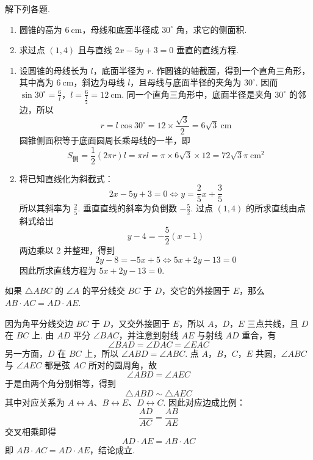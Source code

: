 \begin{problem}
解下列各题.

\begin{enumerate}
    \item 圆锥的高为 \(6 \mathrm{~cm}\)，母线和底面半径成 \(30^\circ\) 角，求它的侧面积.

    \item 求过点 \(\left(1,4\right)\) 且与直线 \(2x-5y+3=0\) 垂直的直线方程.
\end{enumerate}
\end{problem}

\begin{solution}
\begin{enumerate}
    \item 设圆锥的母线长为 \(l\)，底面半径为 \(r\). 作圆锥的轴截面，得到一个直角三角形，其中高为 \(6\mathrm{~cm}\)，斜边为母线 \(l\)，且母线与底面半径的夹角为 \(30^\circ\). 因而
\(\sin30^\circ=\frac{6}{l}\)，\(l=\frac6{\frac{1}{2}}=12\mathrm{~cm}\).
    同一个直角三角形中，底面半径是夹角 \(30^\circ\) 的邻边，所以
    \[
    r=l\cos30^\circ=12\times\frac{\sqrt3}{2}=6\sqrt3\mathrm{~cm}
    \]
    圆锥侧面积等于底面圆周长乘母线的一半，即
    \[
    S_{\text{侧}}=\frac12(2\pi r)l=\pi rl
    =\pi\times6\sqrt3\times12=72\sqrt3\pi\mathrm{~cm}^2
    \]
    \item 将已知直线化为斜截式：
    \[
    2x-5y+3=0\Longleftrightarrow y=\frac25x+\frac35
    \]
    所以其斜率为 \(\frac25\). 垂直直线的斜率为负倒数 \(-\frac52\). 过点 \(\left(1,4\right)\) 的所求直线由点斜式给出
    \[
    y-4=-\frac52(x-1)
    \]
    两边乘以 \(2\) 并整理，得到
    \[
    2y-8=-5x+5\Longleftrightarrow 5x+2y-13=0
    \]
    因此所求直线方程为 \(5x+2y-13=0\).
\end{enumerate}
\end{solution}

\begin{problem}
如果 \( \triangle ABC \) 的 \( \angle A \) 的平分线交 \(BC\) 于 \(D\)，交它的外接圆于 \(E\)，那么 \( AB\cdot AC=AD\cdot AE \).

\end{problem}

\begin{solution}
因为角平分线交边 \(BC\) 于 \(D\)，又交外接圆于 \(E\)，所以 \(A\)，\(D\)，\(E\) 三点共线，且 \(D\) 在 \(BC\) 上. 由 \(AD\) 平分 \(\angle BAC\)，并注意到射线 \(AE\) 与射线 \(AD\) 重合，有
\[
\angle BAD=\angle DAC=\angle EAC
\]
另一方面，\(D\) 在 \(BC\) 上，所以 \(\angle ABD=\angle ABC\). 点 \(A\)，\(B\)，\(C\)，\(E\) 共圆，\(\angle ABC\) 与 \(\angle AEC\) 都是弦 \(AC\) 所对的圆周角，故
\[
\angle ABD=\angle AEC
\]
于是由两个角分别相等，得到
\[
\triangle ABD\sim\triangle AEC
\]
其中对应关系为 \(A\leftrightarrow A\)、\(B\leftrightarrow E\)、\(D\leftrightarrow C\). 因此对应边成比例：
\[
\frac{AD}{AC}=\frac{AB}{AE}
\]
交叉相乘即得
\[
AD\cdot AE=AB\cdot AC
\]
即 \(AB\cdot AC=AD\cdot AE\)，结论成立.
\end{solution}

